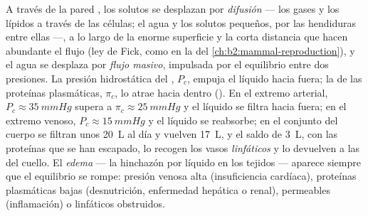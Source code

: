 \begin{proposition}\label{prop:b2:blood-circulation:exchange}
A través de la pared , los solutos se desplazan por
\emph{difusión} --- los gases y los lípidos a través de las células; el
agua y los solutos pequeños, por las hendiduras entre ellas ---, a lo largo
de la enorme superficie y la corta distancia que hacen abundante el flujo
(ley de Fick, como en la  del
\cref{ch:b2:mammal-reproduction}), y el agua se desplaza por \emph{flujo
masivo}, impulsada por el equilibrio entre dos presiones. La presión
hidrostática del , $P_c$, empuja el líquido hacia fuera; la  de las proteínas plasmáticas, $\pi_c$, lo atrae hacia dentro
(\emph{}). En el extremo arterial, $P_c \approx
\qty{35}{mmHg}$ supera a $\pi_c \approx \qty{25}{mmHg}$ y el líquido se
filtra hacia fuera; en el extremo venoso, $P_c \approx \qty{15}{mmHg}$ y el
líquido se reabsorbe; en el conjunto del cuerpo se filtran unos
\qty{20}{L} al día y vuelven \qty{17}{L}, y el saldo de \qty{3}{L}, con las
proteínas que se han escapado, lo recogen los vasos \emph{linfáticos} y lo
devuelven a las  del cuello. El \emph{edema} --- la hinchazón por
líquido en los tejidos --- aparece siempre que el equilibrio se rompe:
presión venosa alta (insuficiencia cardíaca), proteínas plasmáticas bajas
(desnutrición, enfermedad hepática o renal),  permeables
(inflamación) o linfáticos obstruidos.
\end{proposition}
